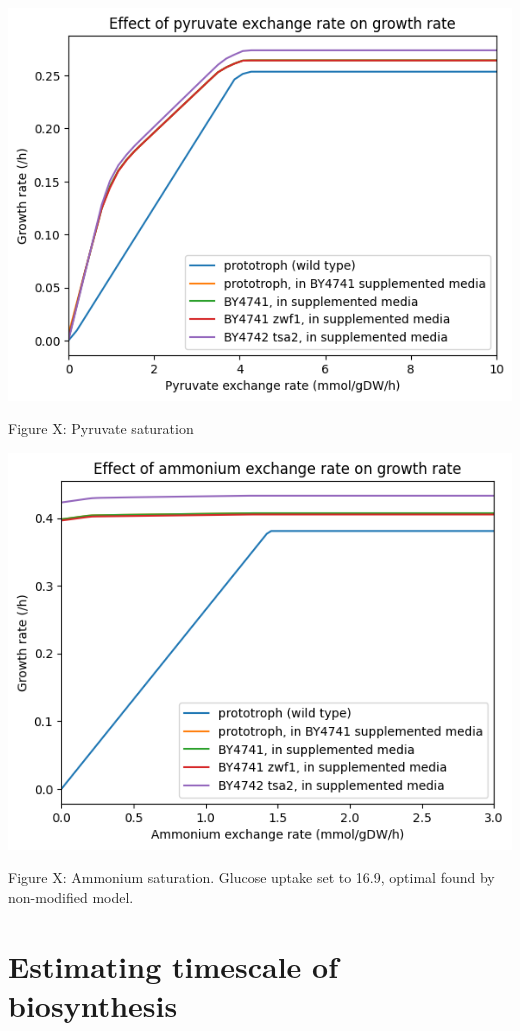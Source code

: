 \begin{center}
\includegraphics[width=.9\linewidth]{ecYeast8-pyruvate-saturation.png}
\end{center} Figure X: Pyruvate saturation

\begin{center}
\includegraphics[width=.9\linewidth]{ecYeast8-ammonium-saturation.png}
\end{center} Figure X: Ammonium saturation.  Glucose uptake set to 16.9, optimal found by non-modified model.

\section{Estimating timescale of biosynthesis}
\label{sec:model-timescale}

